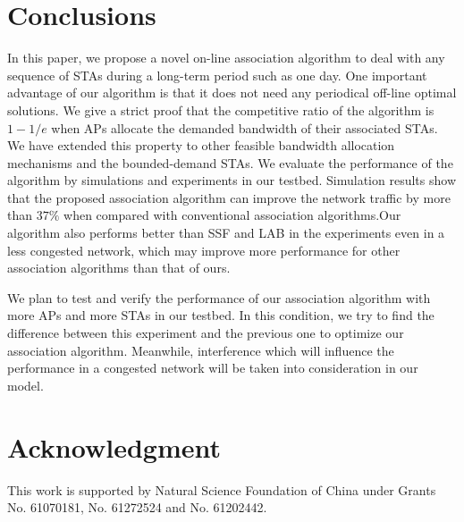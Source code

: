 \documentclass[conference]{IEEEtran}
\begin{document}
  \section{Conclusions}\label{sec:conclusion}
  In this paper, we propose a novel on-line association algorithm to deal with any sequence of STAs during a long-term period such as one day.  One important advantage of our algorithm is that it does not need any periodical off-line optimal solutions.  We give a strict proof that the competitive ratio of the algorithm is $1-1/e$ when APs allocate the demanded bandwidth of their associated STAs.  We have extended this property to other feasible bandwidth allocation mechanisms and the bounded-demand STAs.  We evaluate the performance of the algorithm by simulations and experiments in our testbed.  Simulation results show that the proposed association algorithm can improve the network traffic by more than $37\%$ when compared with conventional association algorithms.Our algorithm also performs better than SSF and LAB in the experiments even in a less congested network, which may improve more performance for other association algorithms than that of ours.

  We plan to test and verify the performance of our association algorithm with more APs and more STAs in our testbed. In this condition, we try to find the difference between this experiment and the previous one to optimize our association algorithm. Meanwhile, interference which will influence the performance in a congested network will be taken into consideration in our model.
\section*{Acknowledgment}

This work is supported by Natural Science Foundation of China under Grants No. 61070181, No. 61272524 and No. 61202442.

  
  













\end{document}
